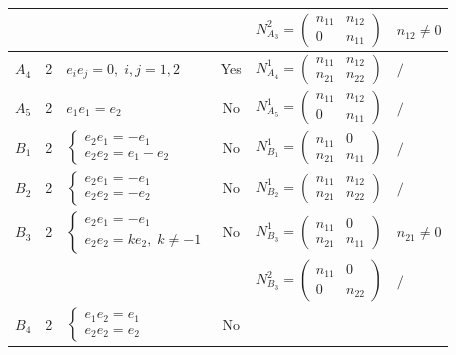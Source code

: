 \documentclass[12pt, reqno]{amsart}
\theoremstyle{plain}
\begin{document}
\begin{table}[htbp]
\begin{tabular}{|c|c|>{\raggedright\arraybackslash}m{3cm}|c|l|l|}
        & & & & $N_{A_3}^2=\begin{pmatrix} n_{11} & n_{12} \\ 0 & n_{11} \end{pmatrix}$ & $n_{12}\neq0$ \\
        \hline
        $A_4$ & 2 & $ e_ie_j=0,\; i,j=1,2 $ & Yes & 
        $N_{A_4}^1=\begin{pmatrix} n_{11} & n_{12} \\ n_{21} & n_{22} \end{pmatrix}$ & $/$ \\
        \hline
        $A_5$ & 2 & $e_1e_1=e_2 $ & No & 
        $N_{A_5}^1=\begin{pmatrix} n_{11} & n_{12} \\ 0 & n_{11} \end{pmatrix}$ & $/$ \\
        \hline
        $B_1$ & 2 & $\begin{cases} e_2e_1=-e_1\\ e_2e_2=e_1-e_2 \end{cases}$ & No & 
        $N_{B_1}^1=\begin{pmatrix} n_{11} & 0 \\ n_{21} & n_{11} \end{pmatrix}$ & $/$ \\
        \hline
        $B_2$ & 2 & $\begin{cases} e_2e_1=-e_1\\ e_2e_2=-e_2 \end{cases}$ & No & 
        $N_{B_2}^1=\begin{pmatrix} n_{11} & n_{12} \\ n_{21} & n_{22} \end{pmatrix}$ & $/$ \\
        \hline
        $B_3$ & 2 & $\begin{cases} e_2e_1=-e_1\\e_2e_2=ke_2,\; k\neq -1 \end{cases}$ & No & 
        $N_{B_3}^1=\begin{pmatrix} n_{11} & 0 \\ n_{21} & n_{11} \end{pmatrix}$ & $n_{21}\neq0$ \\
        & & & & $N_{B_3}^2=\begin{pmatrix} n_{11} & 0 \\ 0 & n_{22} \end{pmatrix}$ & $/$ \\
        \hline
        $B_4$ & 2 & $\begin{cases} e_1e_2=e_1\\e_2e_2=e_2 \end{cases}$ & No & 

\end{tabular}
\end{table}
\end{document}
